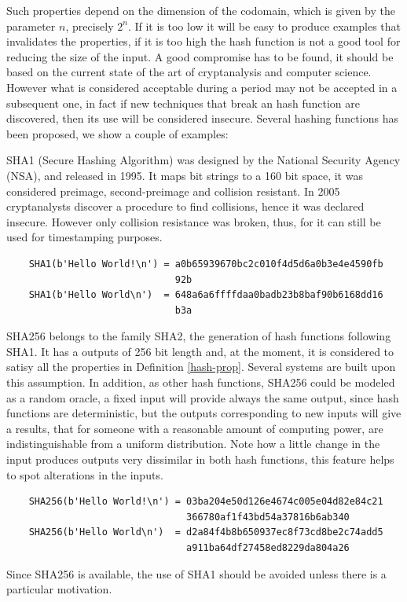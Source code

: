 Such properties depend on the dimension of the codomain, which is given by the parameter $n$, precisely $2^n$. If it is too low it will be easy to produce examples that invalidates the properties, if it is too high the hash function is not a good tool for reducing the size of the input. A good compromise has to be found, it should be based on the current state of the art of cryptanalysis and computer science. However what is considered acceptable during a period may not be accepted in a subsequent one, in fact if new techniques that break an hash function are discovered, then its use will be considered insecure.
Several hashing functions has been proposed, we show a couple of examples:
\begin{myexample}
	SHA1 (Secure Hashing Algorithm) was designed by the National Security Agency (NSA), and released in 1995. It maps bit strings to a 160 bit space, it was considered preimage, second-preimage and collision resistant. In 2005 cryptanalysts discover a procedure to find collisions, hence it was declared insecure. However only collision resistance was broken, thus, for it can still be used for timestamping purposes.
	\begin{verbatim}
	SHA1(b'Hello World!\n') = a0b65939670bc2c010f4d5d6a0b3e4e4590fb
	                          92b
	SHA1(b'Hello World\n')  = 648a6a6ffffdaa0badb23b8baf90b6168dd16
	                          b3a
	\end{verbatim}
\end{myexample}

\begin{myexample}
	SHA256 belongs to the family SHA2, the generation of hash functions following SHA1. It has a outputs of 256 bit length and, at the moment, it is considered to satisy all the properties in Definition \ref{hash-prop}.
	Several systems are built upon this assumption. 
	In addition, as other hash functions, SHA256 could be modeled as a random oracle, a fixed input will provide always the same output, since hash functions are deterministic, but the outputs corresponding to new inputs will give a results, that for someone with a reasonable amount of computing power, are indistinguishable from a uniform distribution. 
	Note how a little change in the input produces outputs very dissimilar in both hash functions, this feature helps to spot alterations in the inputs.
	\begin{verbatim}
	SHA256(b'Hello World!\n') = 03ba204e50d126e4674c005e04d82e84c21
	                            366780af1f43bd54a37816b6ab340
	SHA256(b'Hello World\n')  = d2a84f4b8b650937ec8f73cd8be2c74add5
	                            a911ba64df27458ed8229da804a26
	\end{verbatim}
	Since SHA256 is available, the use of SHA1 should be avoided unless there is a particular motivation. 
\end{myexample}


